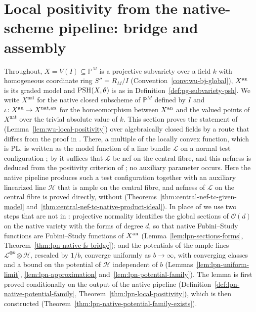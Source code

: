 \section{Local positivity from the native-scheme pipeline: bridge and assembly}

Throughout, $X=V(I)\subseteq\mathbb P^M$ is a projective subvariety over a field $k$ with homogeneous
coordinate ring $S''=R_M/I$ (Convention~\ref{conv:wu-bj-global}), $X^{\mathrm{an}}$ is its graded model and
$\operatorname{PSH}(X,\theta)$ is as in Definition~\ref{def:pg-subvariety-psh}. We write $X^{\mathrm{nat}}$ for the native
closed subscheme of $\mathbb P^M$ defined by $I$ and $\iota\colon X^{\mathrm{an}}\to X^{\mathrm{nat},\mathrm{an}}$ for the
homeomorphism between $X^{\mathrm{an}}$ and the valued points of $X^{\mathrm{nat}}$ over the trivial absolute value of $k$.
This section proves the statement of \cite[Lemma~5.5]{FHX} (Lemma~\ref{lem:wu-local-positivity}) over
algebraically closed fields by a route that differs from the proof in \cite{FHX}. There, a multiple of the locally
convex function, which is PL, is written as the model function of a line bundle $\mathcal L$ on a normal test
configuration \cite[Theorem~2.31]{BJ22}; by \cite[Definition~3.2 and Lemma~4.3]{BJ22} it suffices that $\mathcal L$ be
nef on the central fibre, and this nefness is deduced from the positivity criterion of \cite{CLD12}; no auxiliary
parameter occurs. Here the native pipeline produces such a test configuration together with an auxiliary
linearized line $\mathcal H$ that is ample on the central fibre, and nefness of $\mathcal L$ on the central fibre is
proved directly, without \cite{CLD12} (Theorems~\ref{thm:central-nef-tc-given-model}
and~\ref{thm:central-nef-tc-native-product-ideal}). In place of \cite[Lemma~4.3]{BJ22} we use two steps that are not
in \cite{FHX}: projective normality identifies the global sections of $\mathcal O(d)$ on the native variety with the
forms of degree $d$, so that native Fubini--Study functions are Fubini--Study functions of $X^{\mathrm{an}}$
(Lemma~\ref{lem:lpn-sections-forms}, Theorem~\ref{thm:lpn-native-fs-bridge}); and the potentials of the ample lines
$\mathcal L^{\otimes b}\otimes\mathcal H$, rescaled by $1/b$, converge uniformly as $b\to\infty$, with converging
classes and a bound on the potential of $\mathcal H$ independent of $b$ (Lemmas~\ref{lem:lpn-uniform-limit},
\ref{lem:lpn-approximation} and~\ref{lem:lpn-potential-family}). The lemma is first proved conditionally on the
output of the native pipeline (Definition~\ref{def:lpn-native-potential-family}, Theorem~\ref{thm:lpn-local-positivity}),
which is then constructed (Theorem~\ref{thm:lpn-native-potential-family-exists}).

